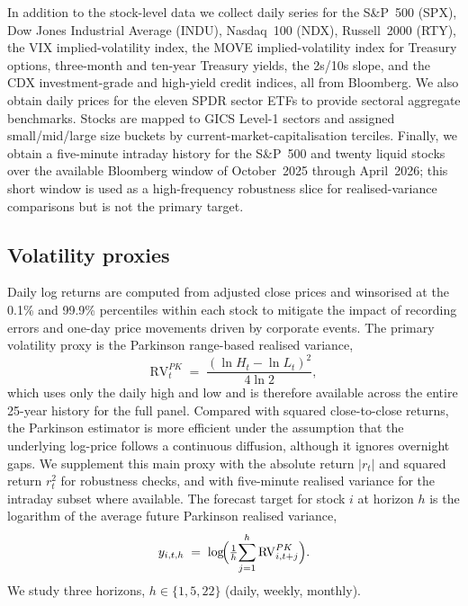 \documentclass[11pt,a4paper]{article}
\newcommand{\RVPK}{\mathrm{RV}^{PK}}
\begin{document}
In addition to the stock-level data we collect daily series for the
S\&P~500 (SPX), Dow Jones Industrial Average (INDU), Nasdaq~100 (NDX),
Russell~2000 (RTY), the VIX implied-volatility index, the MOVE
implied-volatility index for Treasury options, three-month and ten-year
Treasury yields, the 2s/10s slope, and the CDX investment-grade and
high-yield credit indices, all from Bloomberg. We also obtain daily
prices for the eleven SPDR sector ETFs to provide sectoral aggregate
benchmarks. Stocks are mapped to GICS Level-1 sectors and assigned
small/mid/large size buckets by current-market-capitalisation terciles.
Finally, we obtain a five-minute intraday history for the S\&P~500 and
twenty liquid stocks over the available Bloomberg window of October~2025
through April~2026; this short window is used as a high-frequency
robustness slice for realised-variance comparisons but is not the primary
target.

\subsection{Volatility proxies}

Daily log returns are computed from adjusted close prices and winsorised
at the 0.1\% and 99.9\% percentiles within each stock to mitigate the
impact of recording errors and one-day price movements driven by
corporate events. The primary volatility proxy is the Parkinson
range-based realised variance,
\begin{equation}
  \RVPK_t \;=\; \frac{(\ln H_t - \ln L_t)^2}{4\ln 2},
  \label{eq:parkinson}
\end{equation}
which uses only the daily high and low and is therefore available across
the entire 25-year history for the full panel. Compared with squared
close-to-close returns, the Parkinson estimator is more efficient under
the assumption that the underlying log-price follows a continuous
diffusion, although it ignores overnight gaps. We supplement this main
proxy with the absolute return $|r_t|$ and squared return $r_t^2$ for
robustness checks, and with five-minute realised variance for the
intraday subset where available. The forecast target for stock $i$ at
horizon $h$ is the logarithm of the average future Parkinson realised
variance,
\begin{equation}
  y_{i,t,h} \;=\; \log\!\Bigl(\tfrac{1}{h}\!\sum_{j=1}^{h}
  \RVPK_{i,t+j}\Bigr).
\end{equation}
We study three horizons, $h\in\{1,5,22\}$ (daily, weekly, monthly).
\end{document}
